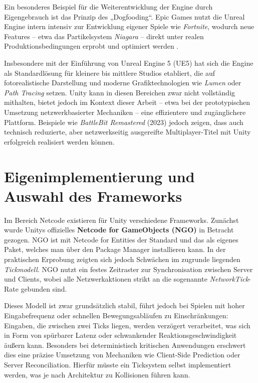 Ein besonderes Beispiel für die Weiterentwicklung der Engine durch Eigengebrauch ist das Prinzip des „Dogfooding“. Epic Games nutzt die Unreal Engine intern intensiv zur Entwicklung eigener Spiele wie \textit{Fortnite}, wodurch neue Features -- etwa das Partikelsystem \textit{Niagara} -- direkt unter realen Produktionsbedingungen erprobt und optimiert werden \cite{dogfoodingexample}.

Insbesondere mit der Einführung von Unreal Engine 5 (UE5) hat sich die Engine als Standardlösung für kleinere bis mittlere Studios etabliert, die auf fotorealistische Darstellung und moderne Grafiktechnologien wie \textit{Lumen} oder \textit{Path Tracing} setzen. Unity kann in diesen Bereichen zwar nicht vollständig mithalten, bietet jedoch im Kontext dieser Arbeit -- etwa bei der prototypischen Umsetzung netzwerkbasierter Mechaniken -- eine effizientere und zugänglichere Plattform. Beispiele wie \textit{BattleBit Remastered} (2023) jedoch zeigen, dass auch technisch reduzierte, aber netzwerkseitig ausgereifte Multiplayer-Titel mit Unity erfolgreich realisiert werden können.

\section{Eigenimplementierung und Auswahl des Frameworks}

Im Bereich Netcode existieren für Unity verschiedene Frameworks. Zunächst wurde Unitys offizielles \textbf{Netcode for GameObjects (NGO)} in Betracht gezogen. NGO ist mit Netcode for Entities der Standard und das als eigenes Paket, welches man über den Package Manager installieren kann.   In der praktischen Erprobung zeigten sich jedoch Schwächen im zugrunde liegenden \textit{Tickmodell}. NGO nutzt ein festes Zeitraster zur Synchronisation zwischen Server und Clients, wobei alle Netzwerkaktionen strikt an die sogenannte \textit{NetworkTick}-Rate gebunden sind.

Dieses Modell ist zwar grundsätzlich stabil, führt jedoch bei Spielen mit hoher Eingabefrequenz oder schnellen Bewegungsabläufen zu Einschränkungen: Eingaben, die zwischen zwei Ticks liegen, werden verzögert verarbeitet, was sich in Form von spürbarer Latenz oder schwankender Reaktionsgeschwindigkeit äußern kann. Besonders bei deterministisch kritischen Anwendungen erschwert dies eine präzise Umsetzung von Mechaniken wie Client-Side Prediction oder Server Reconciliation. 
Hierfür müsste ein Ticksystem selbst implementiert werden, was je nach Architektur zu Kollisionen führen kann.

